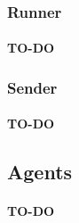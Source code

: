 \subsubsection*{Runner}

\paragraph*{T\+O-\/\+DO}

\subsubsection*{Sender}

\paragraph*{T\+O-\/\+DO}

\subsection*{Agents}

\paragraph*{T\+O-\/\+DO}